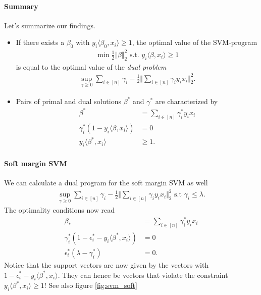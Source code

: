 \documentclass{article}
\newcommand{\sprod}[1]{\langle #1 \rangle}
\newcommand{\norm}[1]{\Vert #1 \Vert}
\begin{document}
\paragraph{Summary} Let's summarize our findings.
\begin{itemize}
    \item If there exists a $\beta_0$ with $y_i\sprod{\beta_0,x_i}\geq 1$, the optimal value of the SVM-program
    \begin{align*}
        \min \tfrac{1}{2}\norm{\beta}_2^2 \text{ s.t. } y_i\sprod{\beta,x_i} \geq 1
    \end{align*}
    is equal to the optimal value of the \emph{dual problem}
    \begin{align*}
        \sup_{\gamma \geq 0} \sum_{i \in [n]}\gamma_i -\tfrac{1}{2} \norm{\sum_{i\in [n]}\gamma_i y_i x_i}_2^2.
    \end{align*}
    \item Pairs of primal and dual solutions $\beta^*$ and $\gamma^*$
 are characterized by
 \begin{align*}
     \beta^* &= \sum_{i\in [n]} \gamma_i^*y_ix_i \\
     \gamma_i^*(1-y_i \sprod{\beta,x_i})&=0 \\
     y_i \sprod{\beta^*,x_i}&\geq1.
 \end{align*}\end{itemize}

 \paragraph{Soft margin SVM} We can calculate a dual program for the soft margin SVM as well
\begin{align*}
    \sup_{\gamma \geq 0} \sum_{i \in [n]}\gamma_i -\tfrac{1}{2} \norm{\sum_{i\in [n]}\gamma_i y_i x_i}_2^2 \text{ s.t } \gamma_i \leq \lambda.
\end{align*}
The optimality conditions now read
\begin{align*}
    \beta_* &= \sum_{i\in [n]} \gamma_i^*y_ix_i \\ 
    \gamma_i^*(1-\epsilon_i^*-y_i \sprod{\beta^*,x_i})&=0\\
    \epsilon_i^*(\lambda-\gamma_i^*)&= 0.
\end{align*}
Notice that the support vectors are now given by the vectors with $1-\epsilon_i^*-y_i \sprod{\beta^*,x_i}$. They can hence be vectors that violate the constraint $y_i \sprod{\beta^*,x_i}\geq 1$! See also figure \ref{fig:svm_soft}
\end{document}
